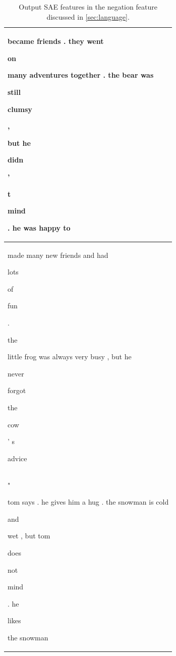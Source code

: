 \documentclass{article} %
\begin{document}
\begin{table}[h]
\begin{tabular}{|l|}
became friends . they went \colorbox{rgb,255:red,240;green,246;blue,251}{\strut  on} many adventures together . the bear was \colorbox{rgb,255:red,242;green,247;blue,252}{\strut  still} clumsy \colorbox{rgb,255:red,241;green,246;blue,252}{\strut  ,} but he \colorbox{rgb,255:red,246;green,250;blue,253}{\strut  didn} \colorbox{rgb,255:red,240;green,246;blue,251}{\strut  '} \colorbox{rgb,255:red,106;green,130;blue,166}{\strut  t} \colorbox{rgb,255:red,228;green,238;blue,247}{\strut  mind} . he was happy to \\ 
\hline 

made many new friends and had \colorbox{rgb,255:red,244;green,248;blue,252}{\strut  lots} of \colorbox{rgb,255:red,245;green,249;blue,253}{\strut  fun} . \colorbox{rgb,255:red,247;green,250;blue,253}{\strut  the} little frog was always very busy , but he \colorbox{rgb,255:red,106;green,130;blue,166}{\strut  never} forgot \colorbox{rgb,255:red,246;green,250;blue,253}{\strut  the} \colorbox{rgb,255:red,238;green,244;blue,250}{\strut  cow} ' s \colorbox{rgb,255:red,237;green,244;blue,250}{\strut  advice} \\ 
\hline 

\colorbox{rgb,255:red,244;green,249;blue,253}{\strut  "} tom says . he gives him a hug . the snowman is cold \colorbox{rgb,255:red,243;green,247;blue,252}{\strut  and} wet , but tom \colorbox{rgb,255:red,238;green,245;blue,251}{\strut  does} \colorbox{rgb,255:red,106;green,130;blue,166}{\strut  not} \colorbox{rgb,255:red,216;green,231;blue,243}{\strut  mind} . he \colorbox{rgb,255:red,241;green,246;blue,252}{\strut  likes} the snowman \\ 
\hline 

\hline
\end{tabular}
\caption{Output SAE features in the negation feature discussed in \autoref{sec:language}.}
\label{tab:sae_features}
\end{table}
\end{document}
